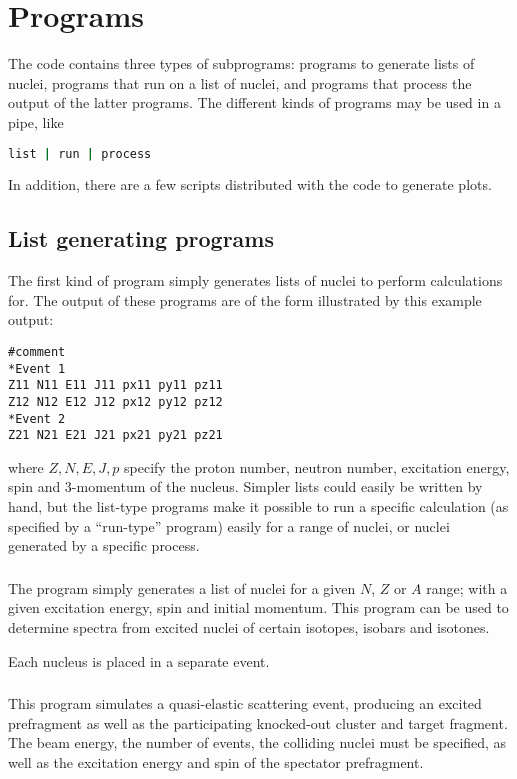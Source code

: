 \section{Programs}
The \codename{} code contains three types of subprograms: programs to generate lists of nuclei, programs that run on a list of nuclei, and programs that process the output of the latter programs.
The different kinds of programs may be used in a pipe, like
\begin{lstlisting}[language=bash]
list | run | process
\end{lstlisting}

In addition, there are a few  scripts distributed with the code to generate plots.

\subsection{List generating programs}
The first kind of program simply generates lists of nuclei to perform calculations for. The output of these programs are of the form illustrated by this example output:
\begin{lstlisting}
#comment
*Event 1
Z11 N11 E11 J11 px11 py11 pz11
Z12 N12 E12 J12 px12 py12 pz12
*Event 2
Z21 N21 E21 J21 px21 py21 pz21
\end{lstlisting}
where $Z,N,E,J,p$ specify the proton number, neutron number, excitation energy, spin and 3-momentum of the nucleus. Simpler lists could easily be written by hand, but the list-type programs make it possible to run a specific calculation (as specified by a ``run-type'' program) easily for a range of nuclei, or nuclei generated by a specific process.

\subsubsection{}
The  program simply generates a list of nuclei for a given $N$, $Z$ or $A$ range; with a given excitation energy, spin and initial momentum. This program can be used to determine spectra from excited nuclei of certain isotopes, isobars and isotones.

Each nucleus is placed in a separate event.

\subsubsection{}
This program simulates a quasi-elastic scattering event, producing an excited prefragment as well as the participating knocked-out cluster and target fragment.
The beam energy, the number of events, the colliding nuclei must be specified, as well as the excitation energy and spin of the spectator prefragment.

